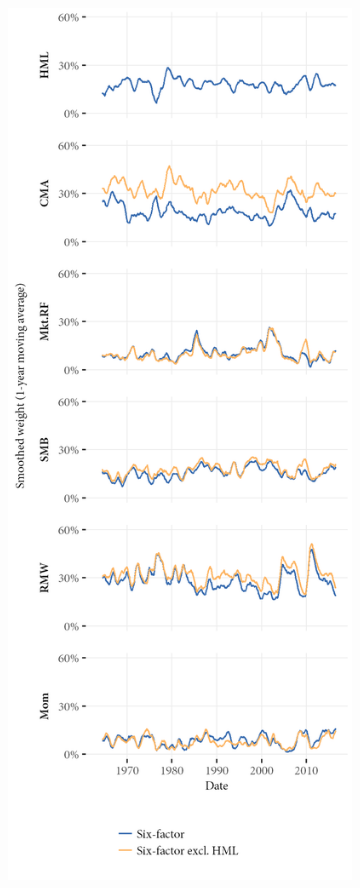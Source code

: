 \begin{figure}[htbp]
  \centering
  \footnotesize
  \begin{subfigure}{0.45\textwidth}

    \includegraphics[width=\textwidth]{graphics/weights/appendix_Weights_CDB_6F_EXCL_HML_6F.png}

\end{subfigure}
\end{figure}
